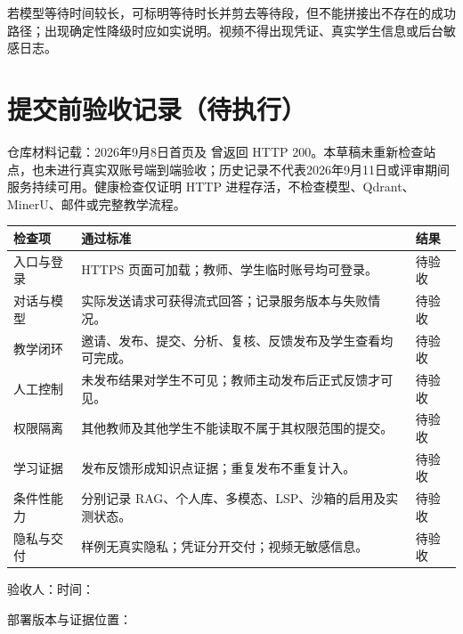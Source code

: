 \documentclass[UTF8,a4paper,zihao=-4,fontset=fandol]{ctexart}
\begin{document}
若模型等待时间较长，可标明等待时长并剪去等待段，但不能拼接出不存在的成功路径；出现确定性降级时应如实说明。视频不得出现凭证、真实学生信息或后台敏感日志。

\section{提交前验收记录（待执行）}
仓库材料记载：2026年9月8日首页及  曾返回 HTTP 200。本草稿未重新检查站点，也未进行真实双账号端到端验收；历史记录不代表2026年9月11日或评审期间服务持续可用。健康检查仅证明 HTTP 进程存活，不检查模型、Qdrant、MinerU、邮件或完整教学流程。

\noindent\begin{longtable}{@{}p{3.2cm}p{9cm}p{2cm}@{}}
\toprule
检查项 & 通过标准 & 结果 \\
\midrule
\endhead
入口与登录 & HTTPS 页面可加载；教师、学生临时账号均可登录。 & 待验收 \\
对话与模型 & 实际发送请求可获得流式回答；记录服务版本与失败情况。 & 待验收 \\
教学闭环 & 邀请、发布、提交、分析、复核、反馈发布及学生查看均可完成。 & 待验收 \\
人工控制 & 未发布结果对学生不可见；教师主动发布后正式反馈才可见。 & 待验收 \\
权限隔离 & 其他教师及其他学生不能读取不属于其权限范围的提交。 & 待验收 \\
学习证据 & 发布反馈形成知识点证据；重复发布不重复计入。 & 待验收 \\
条件性能力 & 分别记录 RAG、个人库、多模态、LSP、沙箱的启用及实测状态。 & 待验收 \\
隐私与交付 & 样例无真实隐私；凭证分开交付；视频无敏感信息。 & 待验收 \\
\bottomrule
\end{longtable}
\noindent 验收人：\underline{\hspace{3cm}}\quad 时间：\underline{\hspace{4cm}}\par
\noindent 部署版本与证据位置：\underline{\hspace{10cm}}
\end{document}
